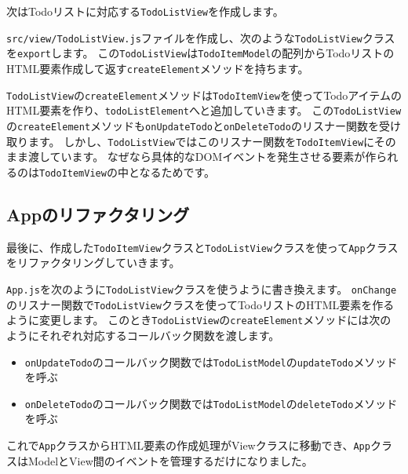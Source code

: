 次はTodoリストに対応する\texttt{TodoListView}を作成します。

\texttt{src/view/TodoListView.js}ファイルを作成し、次のような\texttt{TodoListView}クラスを\texttt{export}します。
この\texttt{TodoListView}は\texttt{TodoItemModel}の配列からTodoリストのHTML要素作成して返す\texttt{createElement}メソッドを持ちます。



\texttt{TodoListView}の\texttt{createElement}メソッドは\texttt{TodoItemView}を使ってTodoアイテムのHTML要素を作り、\texttt{todoListElement}へと追加していきます。
この\texttt{TodoListView}の\texttt{createElement}メソッドも\texttt{onUpdateTodo}と\texttt{onDeleteTodo}のリスナー関数を受け取ります。
しかし、\texttt{TodoListView}ではこのリスナー関数を\texttt{TodoItemView}にそのまま渡しています。
なぜなら具体的なDOMイベントを発生させる要素が作られるのは\texttt{TodoItemView}の中となるためです。

\hypertarget{app-refactoring}{%
\subsection{Appのリファクタリング}\label{app-refactoring}}

最後に、作成した\texttt{TodoItemView}クラスと\texttt{TodoListView}クラスを使って\texttt{App}クラスをリファクタリングしていきます。

\texttt{App.js}を次のように\texttt{TodoListView}クラスを使うように書き換えます。
\texttt{onChange}のリスナー関数で\texttt{TodoListView}クラスを使ってTodoリストのHTML要素を作るように変更します。
このとき\texttt{TodoListView}の\texttt{createElement}メソッドには次のようにそれぞれ対応するコールバック関数を渡します。

\begin{itemize}
\item
  \texttt{onUpdateTodo}のコールバック関数では\texttt{TodoListModel}の\texttt{updateTodo}メソッドを呼ぶ
\item
  \texttt{onDeleteTodo}のコールバック関数では\texttt{TodoListModel}の\texttt{deleteTodo}メソッドを呼ぶ
\end{itemize}



これで\texttt{App}クラスからHTML要素の作成処理がViewクラスに移動でき、\texttt{App}クラスはModelとView間のイベントを管理するだけになりました。

